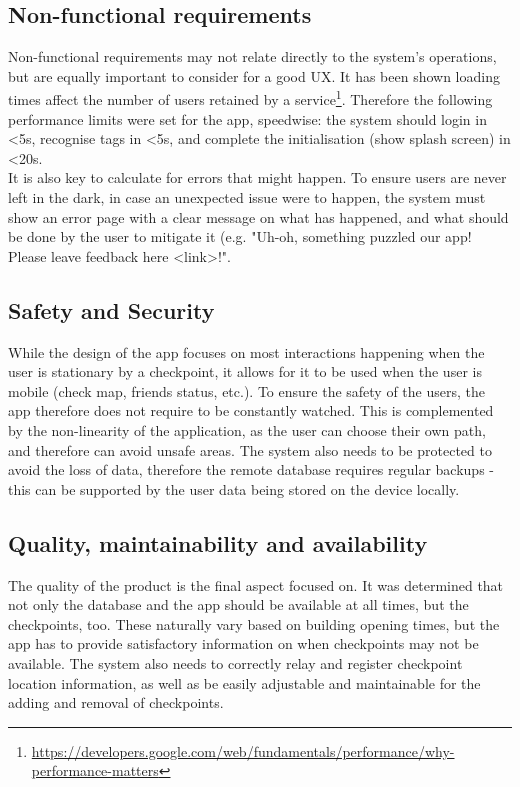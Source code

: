 \documentclass[10pt,twocolumn]{article} %
\begin{document}
\subsection*{Non-functional requirements}
Non-functional requirements may not relate directly to the system's operations, but are equally important to consider for a good UX. It has been shown loading times affect the number of users retained by a service\footnote{\url{https://developers.google.com/web/fundamentals/performance/why-performance-matters}}. Therefore the following performance limits were set for the app, speedwise: the system should login in <5s, recognise tags in <5s, and complete the initialisation (show splash screen) in <20s.\\
It is also key to calculate for errors that might happen. To ensure users are never left in the dark, in case an unexpected issue were to happen, the system must show an error page with a clear message on what has happened, and what should be done by the user to mitigate it (e.g. "Uh-oh, something puzzled our app! Please leave feedback here <link>!".
\subsection*{Safety and Security}
While the design of the app focuses on most interactions happening when the user is stationary by a checkpoint, it allows for it to be used when the user is mobile (check map, friends status, etc.). To ensure the safety of the users, the app therefore does not require to be constantly watched. This is complemented by the non-linearity of the application, as the user can choose their own path, and therefore can avoid unsafe areas. The system also needs to be protected to avoid the loss of data, therefore the remote database requires regular backups - this can be supported by the user data being stored on the device locally.
\subsection*{Quality, maintainability and availability}
The quality of the product is the final aspect focused on. It was determined that not only the database and the app should be available at all times, but the checkpoints, too. These naturally vary based on building opening times, but the app has to provide satisfactory information on when checkpoints may not be available. The system also needs to correctly relay and register checkpoint location information, as well as be easily adjustable and maintainable for the adding and removal of checkpoints. 
\end{document}
